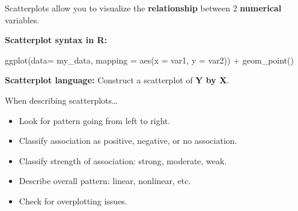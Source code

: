 \documentclass[
  letterpaper,
  DIV=11,
  numbers=noendperiod]{scrreprt}
\newenvironment{Shaded}{\begin{snugshade}}{\end{snugshade}}
\newcommand{\AttributeTok}[1]{\textcolor[rgb]{0.40,0.45,0.13}{#1}}
\newcommand{\FunctionTok}[1]{\textcolor[rgb]{0.28,0.35,0.67}{#1}}
\newcommand{\NormalTok}[1]{\textcolor[rgb]{0.00,0.23,0.31}{#1}}
\newcommand{\SpecialCharTok}[1]{\textcolor[rgb]{0.37,0.37,0.37}{#1}}
\providecommand{\tightlist}{%
  \setlength{\itemsep}{0pt}\setlength{\parskip}{0pt}}\usepackage{longtable,booktabs,array}
\begin{document}
\begin{tcolorbox}[enhanced jigsaw, colframe=quarto-callout-note-color-frame, breakable, colback=white, toprule=.15mm, leftrule=.75mm, left=2mm, opacityback=0, rightrule=.15mm, arc=.35mm, bottomrule=.15mm]
Scatterplots allow you to visualize the \textbf{relationship} between 2
\textbf{numerical} variables.

\textbf{Scatterplot syntax in R:}

\begin{Shaded}
\begin{Highlighting}[]
\FunctionTok{ggplot}\NormalTok{(}\AttributeTok{data=}\NormalTok{ my\_data, }\AttributeTok{mapping =} \FunctionTok{aes}\NormalTok{(}\AttributeTok{x =}\NormalTok{ var1, }\AttributeTok{y =}\NormalTok{ var2)) }\SpecialCharTok{+}
  \FunctionTok{geom\_point}\NormalTok{()}
\end{Highlighting}
\end{Shaded}

\textbf{Scatterplot language:} Construct a scatterplot of \textbf{Y by
X}.
\end{tcolorbox}

\begin{tcolorbox}[enhanced jigsaw, colframe=quarto-callout-note-color-frame, breakable, colback=white, toprule=.15mm, leftrule=.75mm, left=2mm, opacityback=0, rightrule=.15mm, arc=.35mm, bottomrule=.15mm]

When describing scatterplots\ldots{}

\begin{itemize}
\tightlist
\item
  Look for pattern going from left to right.
\item
  Classify association as positive, negative, or no association.
\item
  Classify strength of association: strong, moderate, weak.
\item
  Describe overall pattern: linear, nonlinear, etc.
\item
  Check for overplotting issues.
\end{itemize}

\end{tcolorbox}
\end{document}
